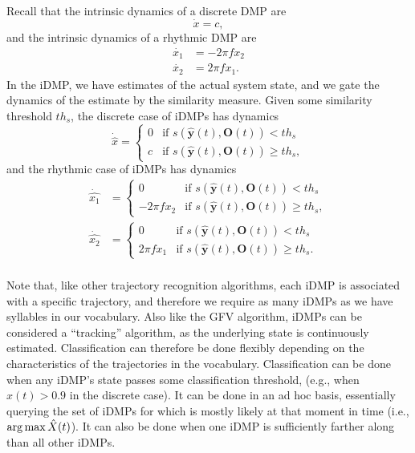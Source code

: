 Recall that the intrinsic dynamics
of a discrete DMP are
\begin{equation*}
  \dot{x} = c,
\end{equation*}
and the intrinsic dynamics
of a rhythmic DMP are
\begin{align*}
  \dot{x_1} &= -2 \pi f x_2 \\
  \dot{x_2} &= 2 \pi f x_1.
\end{align*}
In the iDMP,
we have estimates of the actual system state,
and we gate the dynamics
of the estimate by the similarity measure.
Given some similarity threshold
$th_s$, the discrete case of iDMPs
has dynamics
\begin{equation}
  \label{idmp-dynamics1}
  \dot{\hat{x}} =
  \begin{cases}
    0 & \text{if } s(\hat{\mathbf{y}}(t), \mathbf{O}(t)) < th_s \\
    c & \text{if } s(\hat{\mathbf{y}}(t), \mathbf{O}(t)) \ge th_s,
  \end{cases}
\end{equation}
and the rhythmic case of iDMPs
has dynamics
\begin{align}
  \label{idmp-dynamics2}
  \dot{\hat{x_1}} &=
  \begin{cases}
    0 & \text{if } s(\hat{\mathbf{y}}(t), \mathbf{O}(t)) < th_s \\
    -2 \pi f x_2 & \text{if } s(\hat{\mathbf{y}}(t), \mathbf{O}(t)) \ge th_s,
  \end{cases} \nonumber \\
  \dot{\hat{x_2}} &=
  \begin{cases}
    0 & \text{if } s(\hat{\mathbf{y}}(t), \mathbf{O}(t)) < th_s \\
    2 \pi f x_1 & \text{if } s(\hat{\mathbf{y}}(t), \mathbf{O}(t)) \ge th_s.
  \end{cases} \\
\end{align}

Note that,
like other trajectory recognition algorithms,
each iDMP is associated with
a specific trajectory,
and therefore we require
as many iDMPs as we have syllables
in our vocabulary.
Also like the GFV algorithm,
iDMPs can be considered a ``tracking'' algorithm,
as the underlying state is continuously estimated.
Classification can therefore be done flexibly
depending on the characteristics
of the trajectories in the vocabulary.
Classification can be done when
any iDMP's state passes some classification threshold,
(e.g., when $\hat{x}(t) > 0.9$ in the discrete case).
It can be done in an ad hoc basis,
essentially querying the set of iDMPs
for which is mostly likely at that moment in time
(i.e., $\operatorname*{arg\,max}{\hat{X}(t)}$).
It can also be done when one iDMP
is sufficiently farther along than
all other iDMPs.

